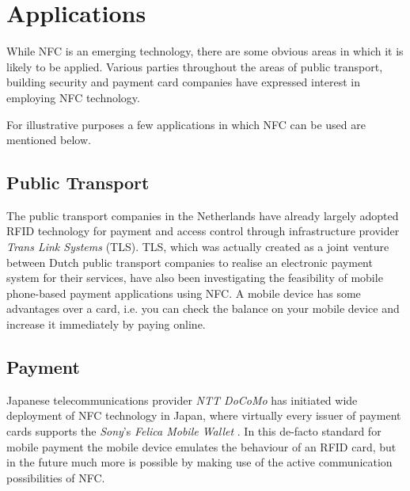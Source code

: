 \section{Applications}
While NFC is an emerging technology, there are some obvious areas in which it is likely to be applied.
Various parties throughout the areas of public transport, building security and payment card companies have expressed interest in employing NFC technology.

For illustrative purposes a few applications in which NFC can be used are mentioned below.

\subsection{Public Transport}
The public transport companies in the Netherlands have already largely adopted RFID technology for payment and access control through infrastructure provider \textit{Trans Link Systems} (TLS).
TLS, which was actually created as a joint venture between Dutch public transport companies to realise an electronic payment system for their services, have also been investigating the feasibility of mobile phone-based payment applications using NFC. %
A mobile device has some advantages over a card, i.e. you can check the balance on your mobile device and increase it immediately by paying online. %


\subsection{Payment}
Japanese telecommunications provider \textit{NTT DoCoMo} has initiated wide deployment of NFC technology in Japan, where virtually every issuer of payment cards supports the \textit{Sony}'s \textit{Felica Mobile Wallet} \cite{yamauchi2006intensive}.
In this de-facto standard for mobile payment the mobile device emulates the behaviour of an RFID card, but in the future much more is possible by making use of the active communication possibilities of NFC. %

